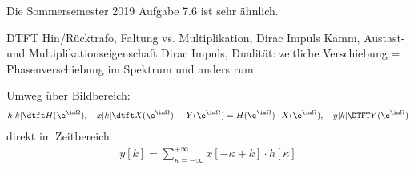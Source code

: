 Die Sommersemester 2019 Aufgabe 7.6 ist sehr ähnlich.
\begin{Werkzeug}
DTFT Hin/Rücktrafo, Faltung vs. Multiplikation, Dirac Impuls Kamm,
Austast- und Multiplikationseigenschaft Dirac Impuls, Dualität:
zeitliche Verschiebung = Phasenverschiebung im Spektrum und anders rum
\end{Werkzeug}
\begin{Ansatz}
Umweg über Bildbereich:
\begin{align}
h[k]\dtft H(\e^{\im\Omega}),\quad x[k]\dtft X(\e^{\im\Omega}),\quad
Y(\e^{\im\Omega}) = H(\e^{\im\Omega}) \cdot X(\e^{\im\Omega}),\quad
y[k] \DTFT Y(\e^{\im\Omega})
\end{align}
direkt im Zeitbereich:
\begin{align}
y[k] = \sum_{\kappa=-\infty}^{+\infty} x[-\kappa + k] \cdot h[\kappa]
\end{align}
\end{Ansatz}

